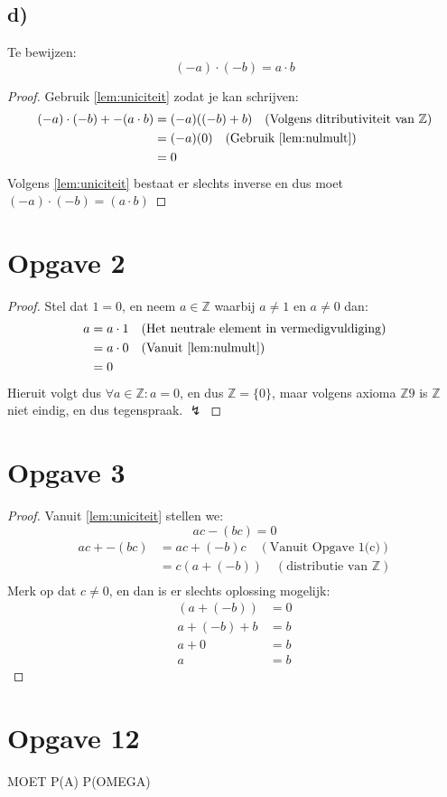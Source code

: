 \documentclass{article}
\newcommand{\Z}{\mathbb{Z}}
\newcommand{\tx}[1]{\text{#1}}
\newcommand{\een}{\text{één }}
\newcommand{\en}{\text{ en }}
\begin{document}
\subsection*{d)}
Te bewijzen:
\[(-a)\cdot(-b) = a \cdot b\]
\begin{proof}
    Gebruik \autoref{lem:uniciteit} zodat je kan schrijven:
    \begin{align*}
        (-a)\cdot(-b) + -(a\cdot b) & = (-a)((-b) + b) \quad (\tx{Volgens ditributiviteit van $\Z$}) \\
                                    & = (-a)(0)      \quad (\tx{Gebruik \autoref{lem:nulmult}})      \\
                                    & = 0
    \end{align*}
    Volgens \autoref{lem:uniciteit} bestaat er slechts \een inverse en dus moet
    $(-a)\cdot(-b) = (a\cdot b)$
\end{proof}

\section*{Opgave 2}
\begin{proof}
    Stel dat $1 = 0$, en neem $a \in \Z$ waarbij $a \neq 1 \en a \neq 0$ dan:
    \begin{align*}
        a & = a \cdot 1 \quad (\tx{Het neutrale element in vermedigvuldiging}) \\
          & = a \cdot 0 \quad (\tx{Vanuit \autoref{lem:nulmult}})              \\
          & = 0
    \end{align*}
    Hieruit volgt dus $\forall a \in \Z: a = 0$, en dus $\Z = \{0\}$, maar
    volgens axioma $\Z9$ is $\Z$ niet eindig, en dus tegenspraak. $\lightning$
\end{proof}

\section*{Opgave 3}
\begin{proof}
    Vanuit \autoref{lem:uniciteit} stellen we:
    \[ac -(bc) = 0\]
    \begin{align*}
        ac + -(bc) & = ac + (-b)c \quad (\tx{Vanuit Opgave 1(c)})                                   \\
                   & = c(a + (-b))                                 \quad(\tx{distributie van $\Z$}) \\
    \end{align*}
    Merk op dat $c \neq 0$, en dan is er slechts \een oplossing mogelijk:
    \begin{align*}
        (a + (-b))   & = 0 \\
        a + (-b) + b & = b \\
        a + 0        & = b \\
        a            & = b
    \end{align*}
\end{proof}

\section*{Opgave 12} MOET P(A) P(OMEGA)
\end{document}
